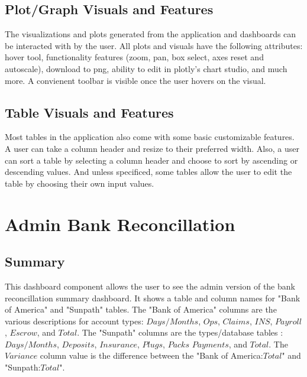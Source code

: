 \documentclass[titlepage]{article}
\begin{document}
\subsection{Plot/Graph Visuals and Features}
The visualizations and plots generated from the application and dashboards can be interacted with by the user. All plots and visuals have the following attributes: hover tool, functionality features (zoom, pan, box select, axes reset and autoscale), download to png, ability to edit in plotly's chart studio, and much more. A convienent toolbar is visible once the user hovers on the visual. 

\subsection{Table Visuals and Features}
Most tables in the application also come with some basic customizable features. A user can take a column header and resize to their preferred width. Also, a user can sort a table by selecting a column header and choose to sort by ascending or descending values. And unless specificed, some tables allow the user to edit the table by choosing their own input values. 
\newpage
\section{Admin Bank Reconcillation}
\subsection{Summary}
This dashboard component allows the user to see the admin version of the bank reconcillation summary dashboard. It shows a table and column names for "Bank of America" and "Sunpath" tables. The "Bank of America" columns are the various descriptions for account types: $Days/Months$, $Ops$, $Claims$, $INS$, $Payroll$, $Escrow$, and $Total$. The "Sunpath" columns are the types/database tables : $Days/Months$, $Deposits$, $Insurance$, $Plugs$, $Packs$ $Payments$, and $Total$. The $Variance$ column value is the difference between the "Bank of America:$Total$" and "Sunpath:$Total$".
\end{document}
